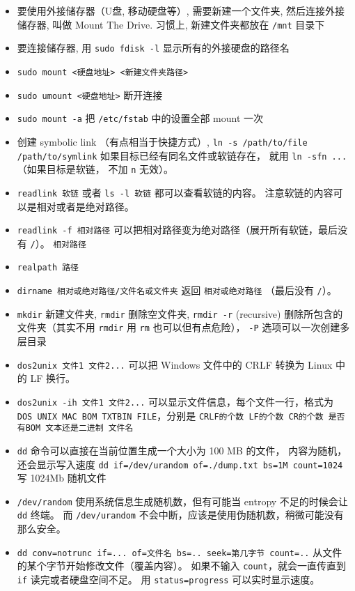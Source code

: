\begin{itemize}
\item 要使用外接储存器（U盘, 移动硬盘等）, 需要新建一个文件夹, 然后连接外接储存器, 叫做 Mount The Drive. 习惯上, 新建文件夹都放在 \verb`/mnt` 目录下
\item 要连接储存器, 用 \verb`sudo fdisk -l` 显示所有的外接硬盘的路径名
\item \verb`sudo mount <硬盘地址> <新建文件夹路径>`
\item \verb`sudo umount <硬盘地址>` 断开连接
\item \verb`sudo mount -a` 把 \verb`/etc/fstab` 中的设置全部 mount 一次
\item 创建 symbolic link （有点相当于快捷方式）, \verb`ln -s /path/to/file /path/to/symlink` 如果目标已经有同名文件或软链存在， 就用 \verb`ln -sfn ...` （如果目标是软链， 不加 \verb`n` 无效）。
\item \verb`readlink 软链` 或者 \verb`ls -l 软链` 都可以查看软链的内容。 注意软链的内容可以是相对或者是绝对路径。
\item \verb`readlink -f 相对路径` 可以把相对路径变为绝对路径（展开所有软链，最后没有 \verb`/`）。 \verb`相对路径`
\item \verb`realpath 路径`
\item \verb`dirname 相对或绝对路径/文件名或文件夹` 返回 \verb`相对或绝对路径` （最后没有 \verb`/`）。
\item \verb`mkdir` 新建文件夹, \verb`rmdir` 删除空文件夹, \verb`rmdir -r` (recursive) 删除所包含的文件夹（其实不用 \verb`rmdir` 用 \verb`rm` 也可以但有点危险）， \verb`-P` 选项可以一次创建多层目录
\item \verb`dos2unix 文件1 文件2...` 可以把 Windows 文件中的 CRLF 转换为 Linux 中的 LF 换行。 
\item \verb`dos2unix -ih 文件1 文件2...` 可以显示文件信息，每个文件一行，格式为 \verb`DOS UNIX MAC BOM TXTBIN FILE`，分别是 \verb`CRLF的个数 LF的个数 CR的个数 是否有BOM 文本还是二进制 文件名`
\item \verb`dd` 命令可以直接在当前位置生成一个大小为 100 MB 的文件， 内容为随机， 还会显示写入速度
\verb`dd if=/dev/urandom of=./dump.txt bs=1M count=1024` 写 1024Mb 随机文件
\item \verb`/dev/random` 使用系统信息生成随机数，但有可能当 entropy 不足的时候会让 \verb`dd` 终端。 而 \verb`/dev/urandom` 不会中断，应该是使用伪随机数，稍微可能没有那么安全。
\item \verb`dd conv=notrunc if=... of=文件名 bs=.. seek=第几字节 count=..`  从文件的某个字节开始修改文件（覆盖内容）。 如果不输入 \verb`count`，就会一直传直到 \verb`if` 读完或者硬盘空间不足。 用 \verb`status=progress` 可以实时显示速度。

\end{itemize}
